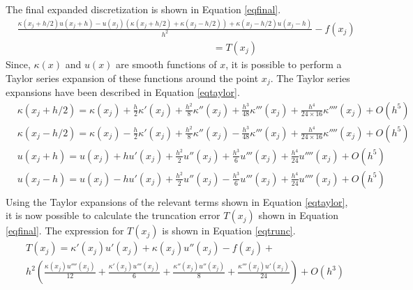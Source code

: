 \documentclass[12pt]{article}
\begin{document}
The final expanded discretization is shown in Equation \ref{eqfinal}.
\begin{equation} \label{eqfinal}
    \begin{aligned}
        &\frac{\kappa(x_j + h/2)u(x_j + h) - u(x_j)\left(\kappa(x_j + h/2) + \kappa(x_j - h/2)\right) + \kappa(x_j - h/2)u(x_j - h)}{h^2} -f(x_j) \\
        &  \quad \quad \quad \quad \quad \quad \quad \quad \quad \quad \quad \quad \quad \quad \quad \quad \quad \quad \quad \quad = T(x_j)
    \end{aligned}
\end{equation}
Since, $\kappa(x)$ and $u(x)$ are smooth functions of $x$, it is possible to perform a Taylor series expansion of these functions around the point $x_j$. The Taylor series expansions have been described in Equation \ref{eqtaylor}.
\begin{equation}\label{eqtaylor}
    \begin{aligned}
        & \kappa(x_j + h/2) = \kappa(x_j) + \frac{h}{2}\kappa'(x_j) + \frac{h^2}{8} \kappa''(x_j) + \frac{h^3}{48} \kappa'''(x_j) + \frac{h^4}{24 \times 16} \kappa''''(x_j) + O(h^5) \\
        & \kappa(x_j - h/2) = \kappa(x_j) - \frac{h}{2}\kappa'(x_j) + \frac{h^2}{8} \kappa''(x_j) - \frac{h^3}{48} \kappa'''(x_j) + \frac{h^4}{24 \times 16} \kappa''''(x_j) + O(h^5) \\
        & u(x_j + h) =  u(x_j) + h u'(x_j) + \frac{h^2}{2} u''(x_j) + \frac{h^3}{6} u'''(x_j) + \frac{h^4}{24} u''''(x_j) + O(h^5) \\
        & u(x_j - h) =  u(x_j) - h u'(x_j) + \frac{h^2}{2} u''(x_j) - \frac{h^3}{6} u'''(x_j) + \frac{h^4}{24} u''''(x_j) + O(h^5) \\
    \end{aligned}
\end{equation}
Using the Taylor expansions of the relevant terms shown in Equation \ref{eqtaylor}, it is now possible to calculate the truncation error $T(x_j)$ shown in Equation \ref{eqfinal}. The expression for $T(x_j)$ is shown in Equation \ref{eqtrunc}.
\begin{equation} \label{eqtrunc}
    \begin{aligned}
        & T(x_j) = \kappa'(x_j)u'(x_j)+ \kappa(x_j) u''(x_j) - f(x_j) + \\
        & h^2 \left( \frac{\kappa(x_j) u''''(x_j)}{12} + \frac{\kappa'(x_j) u'''(x_j)}{6} + \frac{\kappa''(x_j) u''(x_j)}{8} + \frac{\kappa'''(x_j) u'(x_j)}{24}  \right) + O(h^3)
    \end{aligned}
\end{equation}
\end{document}
